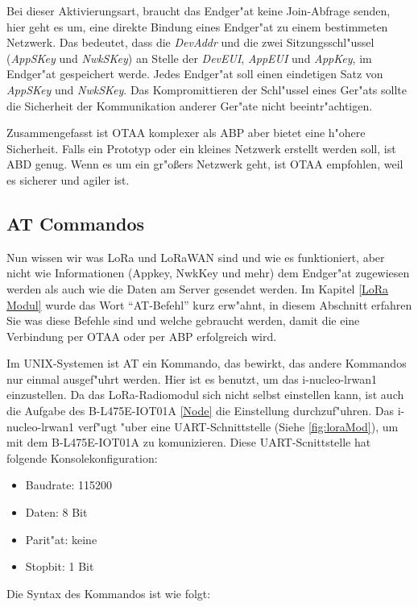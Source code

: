 Bei dieser Aktivierungsart, braucht das Endger"at keine Join-Abfrage senden, hier geht es um, eine direkte Bindung eines Endger"at zu einem bestimmeten Netzwerk. Das bedeutet, dass die \textit{DevAddr} und die zwei Sitzungsschl"ussel (\textit{AppSKey} und \textit{NwkSKey}) an Stelle der \textit{DevEUI}, \textit{AppEUI} und \textit{AppKey}, im Endger"at gespeichert werde. Jedes Endger"at soll einen eindetigen Satz von \textit{AppSKey} und \textit{NwkSKey}. Das Kompromittieren der Schl"ussel eines Ger"ats sollte die Sicherheit der Kommunikation anderer Ger"ate nicht beeintr"achtigen. 


Zusammengefasst ist OTAA komplexer als ABP aber bietet eine h"ohere Sicherheit. Falls ein Prototyp oder ein kleines Netzwerk erstellt werden soll, ist ABD genug. Wenn es um ein gr"o\ss{}ers Netzwerk geht, ist OTAA empfohlen, weil es sicherer und agiler ist. 

\subsection{AT Commandos}\label{AT}

Nun wissen wir was LoRa und LoRaWAN sind und wie es funktioniert, aber nicht wie Informationen (Appkey, NwkKey und mehr) dem Endger"at zugewiesen werden als auch wie die Daten am Server gesendet werden. 
Im Kapitel \ref{LoRa Modul} wurde das Wort ``AT-Befehl'' kurz erw"ahnt, in diesem Abschnitt erfahren Sie was diese Befehle sind und welche gebraucht werden, damit die eine Verbindung per OTAA oder per ABP erfolgreich wird.

Im UNIX-Systemen ist AT ein Kommando, das bewirkt, das andere Kommandos nur einmal ausgef"uhrt werden. Hier ist es benutzt, um das i-nucleo-lrwan1 einzustellen. Da das LoRa-Radiomodul sich nicht selbst einstellen kann, ist auch die Aufgabe des B-L475E-IOT01A \ref{Node} die Einstellung durchzuf"uhren. Das i-nucleo-lrwan1 verf"ugt "uber eine UART-Schnittstelle (Siehe \ref{fig:loraMod}), um mit dem B-L475E-IOT01A zu komunizieren. Diese UART-Scnittstelle hat folgende Konsolekonfiguration: 

\begin{itemize}
	\item Baudrate: 115200
	\item Daten: 8 Bit
	\item Parit"at: keine
	\item Stopbit: 1 Bit
\end{itemize}           

Die Syntax des Kommandos ist wie folgt: 
 
